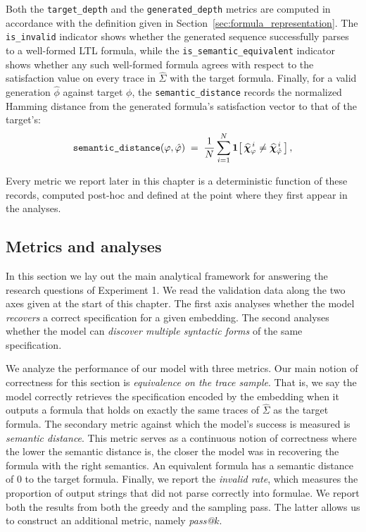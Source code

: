 \documentclass[titlepage,a4paper,11pt]{report}
\DeclareRobustCommand{\RSnew}[1]{{\color{blue!65!black}#1}}
\begin{document}
    Both the \texttt{target\_depth} and the \texttt{generated\_depth} metrics are computed in accordance with the definition given in Section~\ref{sec:formula_representation}. The \texttt{is\_invalid} indicator shows whether the generated sequence successfully parses to a well-formed LTL formula, while the \texttt{is\_semantic\_equivalent} indicator shows whether any such well-formed formula agrees with respect to the satisfaction value on every trace in $\widehat{\Sigma}$ with the target formula. Finally, for a valid generation $\hat\phi$ against target $\phi$, the \texttt{semantic\_distance} records the normalized Hamming distance from the generated formula's satisfaction vector to that of the target's:
    \begin{equation}
        \texttt{semantic\_distance}(\varphi, \hat{\varphi}) \;=\; \frac{1}{N}\sum_{i=1}^{N} \mathbf{1}\!\left[\,\bm{\widehat\chi}_{\varphi}^{\,i} \neq \bm{\widehat\chi}_{\hat{\varphi}}^{\,i}\,\right],
        \label{eq:semantic_distance}
    \end{equation}

    Every metric we report later in this chapter is a deterministic function of these records, computed post-hoc and defined at the point where they first appear in the analyses.

    
    \subsection{Metrics and analyses}\label{sec:exp1_analyses}
    In this section we lay out the main analytical framework for answering the research questions of Experiment 1. We read the validation data along the two axes \RSnew{given at the start of this chapter}. The first axis analyses whether the model \emph{recovers} a correct specification for a given embedding. The second analyses whether the model can \emph{discover multiple syntactic forms} of the same specification. 
    
    We analyze the performance of our model with three metrics. Our main notion of correctness for this section is \textit{equivalence on the trace sample}. That is, we say the model correctly retrieves the specification encoded by the embedding when it outputs a formula that holds on exactly the same traces of $\widehat\Sigma$ as the target formula. The secondary metric against which the model's success is measured is \textit{semantic distance}. This metric serves as a continuous notion of correctness where the lower the semantic distance is, the closer the model was in recovering the formula with the right semantics. An equivalent formula has a semantic distance of 0 to the target formula. Finally, we report the \textit{invalid rate}, which measures the proportion of output strings that did not parse correctly into formulae.  We report both the results from both the greedy and the sampling pass. The latter allows us to construct an additional metric, namely \textit{pass@$k$}.
\end{document}
